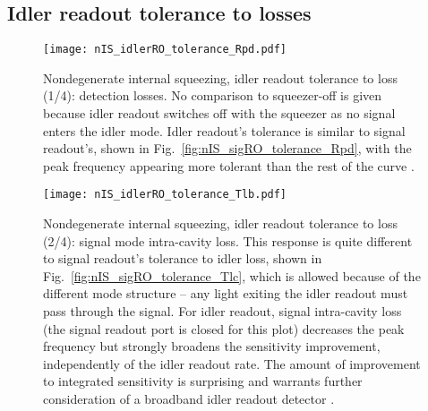 
\subsection{Idler readout tolerance to losses}


\begin{figure}
    \centering
    \texttt{[image: nIS\_idlerRO\_tolerance\_Rpd.pdf]} 
    \caption{  Nondegenerate internal squeezing, idler readout tolerance to loss (1/4): detection losses. No comparison to squeezer-off is given because idler readout switches off with the squeezer as no signal enters the idler mode. Idler readout's tolerance is similar to signal readout's, shown in Fig.~\ref{fig:nIS_sigRO_tolerance_Rpd}, with the peak frequency appearing more tolerant than the rest of the curve . }
    \label{fig:}
\end{figure}
\begin{figure}
	\centering
	\texttt{[image: nIS\_idlerRO\_tolerance\_Tlb.pdf]}
	\caption{ Nondegenerate internal squeezing, idler readout tolerance to loss (2/4): signal mode intra-cavity loss. This response is quite different to signal readout's tolerance to idler loss, shown in Fig.~\ref{fig:nIS_sigRO_tolerance_Tlc}, which is allowed because of the different mode structure -- any light exiting the idler readout must pass through the signal. For idler readout, signal intra-cavity loss (the signal readout port is closed for this plot) decreases the peak frequency but strongly broadens the sensitivity improvement, independently of the idler readout rate. The amount of improvement to integrated sensitivity is surprising  and warrants further consideration of a broadband idler readout detector .}
	\label{fig:}
\end{figure}

